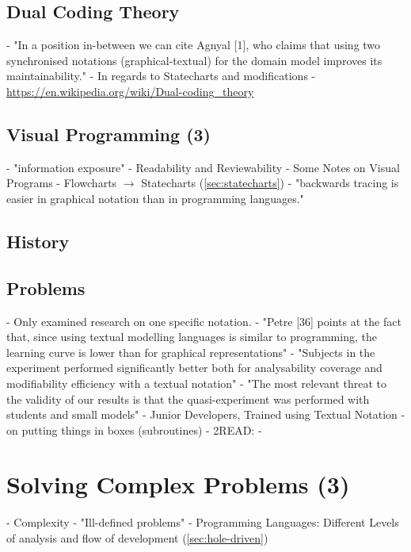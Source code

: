 \subsection{Dual Coding Theory}
- "In a position in-between we can cite Agnyal [1], who claims that using two synchronised notations (graphical-textual) for the domain model improves its maintainability." \autocite[3]{melia_comparison_2016}
- In regards to Statecharts and modifications \autocite[38--39]{leveson_experiences_1991}
- \url{https://en.wikipedia.org/wiki/Dual-coding_theory}
\subsection{Visual Programming (3)}
- "information exposure" \autocite[34]{leveson_experiences_1991}
- Readability and Reviewability \autocite[37-38]{leveson_experiences_1991}
- Some Notes on Visual Programs \autocite[5--6]{green_pictures_1982}
- Flowcharts $\rightarrow$ Statecharts (\ref{sec:statecharts}) \autocite[8]{green_pictures_1982}
- "backwards tracing is easier in graphical notation than in programming languages." \autocite[20]{green_pictures_1982}
\subsection{History}
\subsection{Problems}
- \autocite{melia_comparison_2016} Only examined research on one specific notation.
    - "Petre [36] points at the fact that, since using textual modelling languages is similar to programming, the learning curve is lower than for graphical representations" \autocite[3]{melia_comparison_2016}
    - "Subjects in the experiment performed significantly better both for analysability coverage and modifiability efficiency with a textual notation" \autocite[26]{melia_comparison_2016}
    - "The most relevant threat to the validity of our results is that the quasi-experiment was performed with students and small models" \autocite[26]{melia_comparison_2016}
    - Junior Developers, Trained using Textual Notation
- on putting things in boxes (subroutines) \autocite[23]{green_pictures_1982}
- 2READ: \autocite{bresciani_pitfalls_2015}
- \autocite{cook_unified_2017}

\section{Solving Complex Problems (3)}
- Complexity \autocite[5--11]{ousterhout_philosophy_2018}
- "Ill-defined problems" \autocite[236]{visser_expert_1990}
- Programming Languages: Different Levels of analysis and flow of development (\ref{sec:hole-driven}) \autocite[242--244]{visser_expert_1990}
